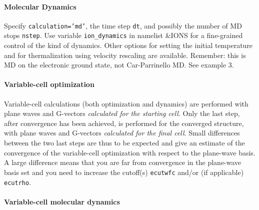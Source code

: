 \documentclass[12pt,a4paper]{article}
\def\PWscf{\texttt{PWscf}}
\begin{document}
\paragraph{Molecular Dynamics} 
Specify \texttt{calculation='md'}, the time step \texttt{dt},
and possibly the number of MD stops \texttt{nstep}.
Use variable \texttt{ion\_dynamics} in namelist \&IONS
for a fine-grained control of the kind of dynamics.
Other options for setting the initial temperature
and for thermalization using velocity rescaling are available.
Remember: this is MD on the electronic ground state, not
Car-Parrinello MD.
See example 3.



\paragraph{Variable-cell optimization}

Variable-cell calculations (both optimization and dynamics) are performed
with plane waves and G-vectors {\em calculated for the starting cell}.
Only the last step, after convergence has been achieved, is performed
for the converged structure, with plane waves and G-vectors
{\em calculated for the final cell}. Small differences between the
two last steps are thus to be expected and give an estimate of the
convergence of the variable-cell optimization with respect to the
plane-wave basis. A large difference means that you are far from
convergence in the plane-wave basis set and you need to increase the
cutoff(s) \texttt{ecutwfc} and/or (if applicable) \texttt{ecutrho}.

\paragraph{Variable-cell molecular dynamics}
\end{document}
